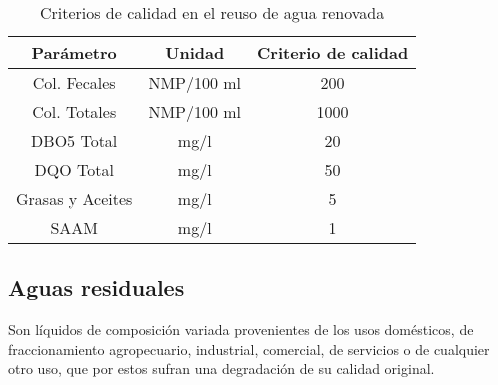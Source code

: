 \begin{table}[h!]
    \centering
    \begin{tabular}{@{}ccc@{}}
    \toprule
    Parámetro        & Unidad       & Criterio de calidad \\ \midrule
    Col. Fecales     & NMP/100   ml & 200                 \\
    Col. Totales     & NMP/100   ml & 1000                \\
    DBO5   Total     & mg/l         & 20                  \\
    DQO Total        & mg/l         & 50                  \\
    Grasas y Aceites & mg/l         & 5                   \\
    SAAM             & mg/l         & 1                   \\ \bottomrule
    \end{tabular}
    \caption{Criterios de calidad en el reuso de agua renovada\cite{cortes1997reuso}}
    \label{tabra3}
\end{table}
\subsection{Aguas residuales}
Son líquidos de composición variada provenientes de los usos domésticos, de fraccionamiento agropecuario, industrial, comercial, de servicios o de cualquier otro uso, que por estos sufran una degradación de su calidad original.
